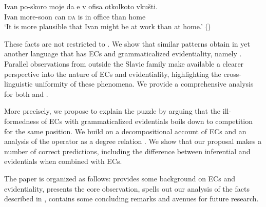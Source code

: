 \documentclass[output=paper,colorlinks,citecolor=brown,newtxmath]{langsci/langscibook}
\begin{document}
	\ea \gll Ivan po-skoro moje da e v ofisa otkolkoto vkušti.\\
	Ivan	more-soon can \textsc{da} is in	office than home \\
        \glt `It is more plausible that Ivan might be at work than at home.' \hfill ()
        \z

\noindent These facts are not restricted to . We show that similar patterns obtain in yet another language that has ECs and grammaticalized evidentiality, namely . Parallel observations from outside the Slavic family make available a clearer perspective into the nature of ECs and evidentiality, highlighting the cross-linguistic uniformity of these phenomena. We provide a comprehensive analysis for both  and .

More precisely, we propose to explain the puzzle by arguing that the ill-formed\-ness of ECs with grammaticalized evidentials boils down to competition for the same position. We build on a decompositional account of ECs \citep{herrub14} and an analysis of the  operator as a degree relation \citep{grewol17}. We show that our proposal makes a number of correct predictions, including  the difference between inferential and  evidentials when combined with ECs.

The paper is organized as follows:  provides some background on ECs and evidentiality,  presents the core observation,  spells out our analysis of the facts described in  ,  contains some concluding remarks and avenues for future research.
\end{document}

